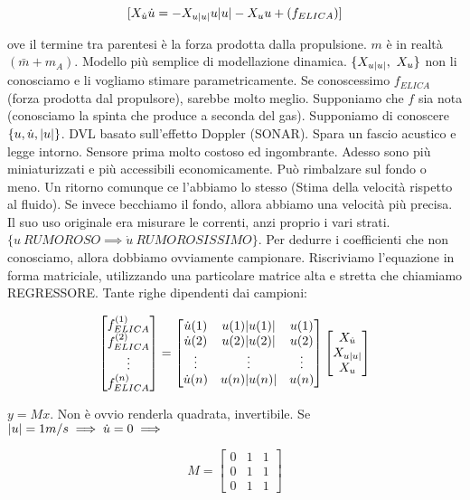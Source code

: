 \[
	[X_{\dot{u}}\dot{u} = -X_{u\lvert u\rvert}u\lvert u\rvert - X_uu + (f_{ELICA})]
\]

ove il termine tra parentesi è la forza prodotta dalla propulsione. $m$ è in realtà $(\bar{m}+m_A)$. Modello più semplice di modellazione dinamica. $\{X_{u\lvert u\rvert},\ X_u\}$ non li conosciamo e li vogliamo stimare parametricamente. Se conoscessimo $f_{ELICA}$ (forza prodotta dal propulsore), sarebbe molto meglio. Supponiamo che $f$ sia nota (conosciamo la spinta che produce a seconda del gas). Supponiamo di conoscere $\{u,\dot{u},\lvert u\rvert\}$. DVL basato sull'effetto Doppler (SONAR). Spara un fascio acustico e legge intorno. Sensore prima molto costoso ed ingombrante. Adesso sono più miniaturizzati e più accessibili economicamente. Può rimbalzare sul fondo o meno. Un ritorno comunque ce l'abbiamo lo stesso (Stima della velocità rispetto al fluido). Se invece becchiamo il fondo, allora abbiamo una velocità più precisa. Il suo uso originale era misurare le correnti, anzi proprio i vari strati. $\{u\ RUMOROSO \implies\dot{u}\ RUMOROSISSIMO\}$. Per dedurre i coefficienti che non conosciamo, allora dobbiamo ovviamente campionare. Riscriviamo l'equazione in forma matriciale, utilizzando una particolare matrice alta e stretta che chiamiamo REGRESSORE. Tante righe dipendenti dai campioni:

\[
	\begin{bmatrix}f_{ELICA}^{(1)}\\f_{ELICA}^{(2)}\\\vdots\\f_{ELICA}^{(n)}\end{bmatrix}=\begin{bmatrix}\dot{u}(1)&u(1)\lvert u(1)\rvert&u(1)\\\dot{u}(2)&u(2)\lvert u(2)\rvert&u(2)\\\vdots&\vdots&\vdots\\\dot{u}(n)&u(n)\lvert u(n)\rvert&u(n)\end{bmatrix}\begin{bmatrix}X_{\dot{u}}\\X_{u\lvert u\rvert}\\X_u\end{bmatrix}
\]

$y=Mx$. Non è ovvio renderla quadrata, invertibile. Se $\lvert u\rvert=1m/s \implies \dot{u}=0 \implies$

\[
	M = \begin{bmatrix}0&1&1\\0&1&1\\0&1&1\end{bmatrix}
\]


